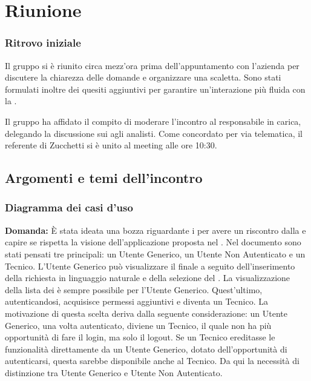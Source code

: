 \section{Riunione}
\subsubsection{Ritrovo iniziale}
Il gruppo si è riunito circa mezz’ora prima dell’appuntamento con l’azienda per discutere la chiarezza delle domande e organizzare una scaletta. Sono stati formulati inoltre dei quesiti aggiuntivi per garantire un’interazione più fluida con la .

Il gruppo ha affidato il compito di moderare l’incontro al responsabile in carica, delegando la discussione sui  agli analisti. Come concordato per via telematica, il referente di Zucchetti si è unito al meeting alle ore 10:30.

\subsection{Argomenti e temi dell'incontro}


\subsubsection{Diagramma dei casi d'uso}

\textbf{Domanda:} È stata ideata una bozza riguardante i  per avere un riscontro dalla  e capire se rispetta la visione dell’applicazione proposta nel .
Nel documento sono stati pensati tre  principali: un Utente Generico, un Utente Non Autenticato e un Tecnico.
L'Utente Generico può visualizzare il  finale a seguito dell'inserimento della richiesta in linguaggio naturale e della selezione del . La visualizzazione della lista dei  è sempre possibile per l'Utente Generico. Quest'ultimo, autenticandosi, acquisisce permessi aggiuntivi e diventa un Tecnico.
La motivazione di questa scelta deriva dalla seguente considerazione: un Utente Generico, una volta autenticato, diviene un Tecnico, il quale non ha più opportunità di fare il login, ma solo il logout. Se un Tecnico ereditasse le funzionalità direttamente da un Utente Generico, dotato dell'opportunità di autenticarsi, questa sarebbe disponibile anche al Tecnico. Da qui la necessità di distinzione tra Utente Generico e Utente Non Autenticato.

